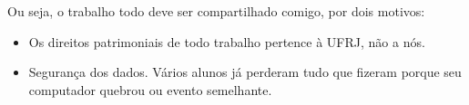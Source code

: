 Ou seja, o trabalho todo deve ser compartilhado comigo, por dois motivos:
\begin{itemize}
    \item Os direitos patrimoniais de todo trabalho pertence à UFRJ, não a nós. 
    \item Segurança dos dados. Vários alunos já perderam tudo que fizeram porque seu computador quebrou ou evento semelhante.
\end{itemize}